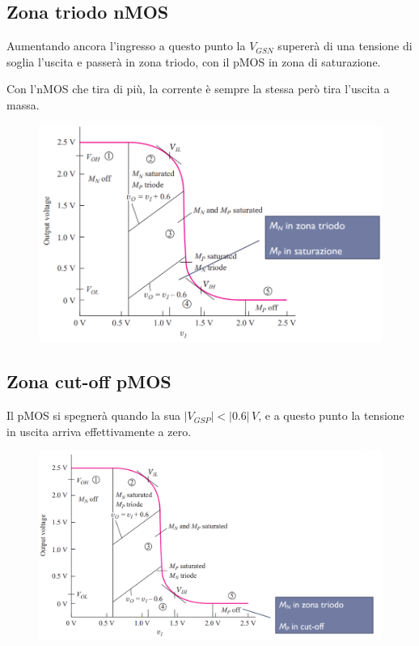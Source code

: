 \newpage
\subsection{Zona triodo nMOS}

Aumentando ancora l'ingresso a questo punto la $V_{GSN}$ supererà di una tensione di soglia l'uscita e passerà in zona triodo, con il pMOS in zona di saturazione.

Con l'nMOS che tira di più, la corrente è sempre la stessa però tira l'uscita a massa.

\begin{figure}[htbp]
    \centering
    \includegraphics[width=0.75\linewidth]{img/zona4.png}
    
    
\end{figure}


\subsection{Zona cut-off pMOS}

Il pMOS si spegnerà quando la sua $|V_{GSP}| < |0.6|\,V$, e a questo punto la tensione in uscita arriva effettivamente a zero.

\begin{figure}[htbp]
    \centering
    \includegraphics[width=0.85\linewidth]{img/ZONA5.png}
    
    
\end{figure}


